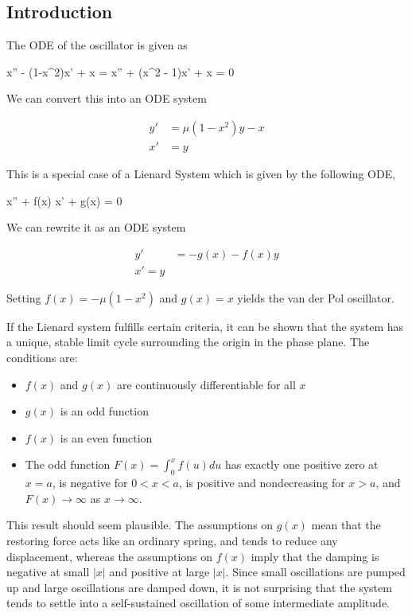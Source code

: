 
\subsection{Introduction}

The ODE of the oscillator is given as

\be\label{20240924:eq1}
x'' - \mu(1-x^2)x' + x = x'' + \mu(x^2 - 1)x' + x = 0
\ee

We can convert this into an ODE system

\begin{align*}
y' &= \mu (1-x^2) y - x \\
x' &= y
\end{align*}

This is a special case of a Lienard System which is given by the following ODE,

\bee
x'' + f(x) x' + g(x) = 0
\eee

We can rewrite it as an ODE system

\begin{align*}
y' &= -g(x) - f(x)y \\
x' = y
\end{align*}

Setting  $f(x) = - \mu(1-x^2)$ and $g(x) = x$ yields the van der Pol oscillator. 

If the Lienard system fulfills certain criteria, it can be shown that the system has a unique, stable limit cycle surrounding the origin in the phase plane. The conditions are:

\begin{itemize}
\item $f(x)$ and $g(x)$ are continuously differentiable for all $x$
\item $g(x)$ is an odd function
\item $f(x)$ is an even function
\item The odd function $F(x) = \int_0^x f(u) du$ has exactly one positive zero at $x=a$, is negative for $0<x<a$, is positive and nondecreasing for $x>a$, and $F(x) \rightarrow \infty$ as $x \rightarrow \infty$.
\end{itemize}

This result should seem plausible. The assumptions on $g(x)$ mean that the restoring force acts like an ordinary spring, and tends to reduce any displacement, whereas the assumptions on $f(x)$ imply that the damping is negative at small $|x|$ and positive at large $|x|$. Since small oscillations are pumped up and large oscillations are damped down, it is not surprising that the system tends to settle into a self-sustained oscillation of some intermediate amplitude.

